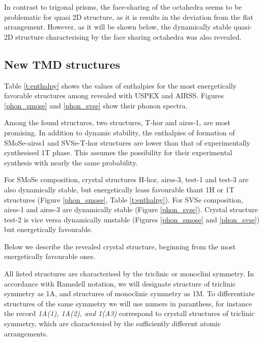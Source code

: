 \documentclass[a4paperm]{article}
\begin{document}
In contrast to trigonal prisms, the face-sharing of the octahedra seems to be problematic for quasi 2D structure, as it is results in the deviation from the flat arrangement.
However, as it will be shown below, the dynamically stable quasi-2D structure characterising by the face sharing octahedra was also revealed.



		\subsection{New TMD structures}

Table \ref{t:enthalpy} shows the values of enthalpies for the most energetically favorable structures among revealed with USPEX and AIRSS.
 Figures \ref{phon_smose} and  \ref{phon_svse} show their phonon spectra. 
 
Among the found structures, two structures, T-hor and airss-1, are most promising.
In addition to dynamic stability, the enthalpies of formation of SMoSe-airss1 and SVSe-T-hor structures are lower than that of experimentally synthesised 1T phase.
This assumes the possibility for their experimental synthesis with nearly the same probability.

For SMoSe composition, crystal structures H-hor, airss-3, test-1 and test-3 are also dynamically stable, but energetically leass favourable thant 1H or 1T structures (Figure \ref{phon_smose}, Table \ref{t:enthalpy}).
For SVSe composition, airss-1 and airss-3 are dynamically stable (Figure \ref{phon_svse}).
Crystal structure test-2 is vice versa dynamically unstable (Figures \ref{phon_smose} and \ref{phon_svse}) but energetically favourable. 

Below we describe the revealed crystal structure, beginning from the most energetically favourable ones.

All listed structures are characterised by the triclinic or monoclini symmetry.
In accordance with Ramsdell notation, we will designate structure of triclinic symmetry as 1A, and structures of monoclinic symmetry as 1M.
To differentiate structures of the same symmetry we will use numers in paranthess, for instance the record {\it 1A(1), 1A(2), and 1(A3)}  correspond to crystall structures of triclinic symmetry, which are charactersied by the sufficiently different atomic arrangements.

\end{document}
